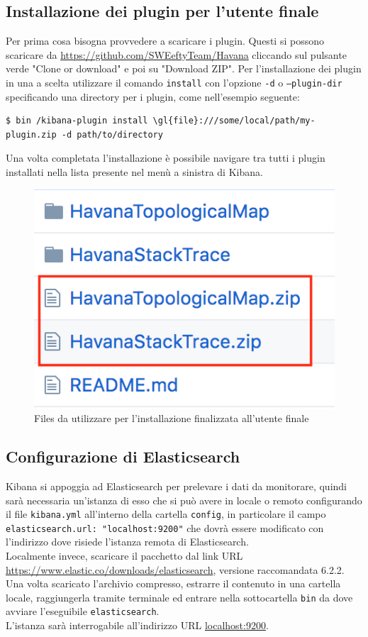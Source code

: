 \subsection{Installazione dei plugin per l'utente finale}
Per prima cosa bisogna provvedere a scaricare i plugin. Questi si possono scaricare da \href{https://github.com/SWEeftyTeam/Havana}{https://github.com/SWEeftyTeam/Havana} cliccando sul pulsante verde "Clone or download" e poi su "Download ZIP".
Per l'installazione dei plugin in una  a scelta utilizzare il comando \texttt{install} con l'opzione \texttt{-d} o \texttt{--plugin-dir}  specificando una directory per i plugin, come nell'esempio seguente:
\begin{lstlisting}
$ bin /kibana-plugin install \gl{file}:///some/local/path/my-plugin.zip -d path/to/directory 
\end{lstlisting}
Una volta completata l'installazione è possibile navigare tra tutti i plugin installati nella lista presente nel menù a sinistra di Kibana.
\begin{figure}[H]
	\centering 
	\includegraphics{Images/strutturauser}
	\caption{Files da utilizzare per l'installazione finalizzata all'utente finale}
\end{figure}
\subsection{Configurazione di Elasticsearch}
Kibana si appoggia ad Elasticsearch per prelevare i dati da monitorare, quindi sarà necessaria un'istanza di esso che si può avere in locale o remoto configurando il file \texttt{kibana.yml} all'interno della cartella \texttt{config}, in particolare il campo \texttt{elasticsearch.url: "localhost:9200"} che dovrà essere modificato con l'indirizzo dove risiede l'istanza remota di Elasticsearch.\\
Localmente invece, scaricare il pacchetto dal link URL \url{https://www.elastic.co/downloads/elasticsearch}, versione raccomandata 6.2.2.
Una volta scaricato l'archivio compresso, estrarre il contenuto in una cartella locale, raggiungerla tramite terminale ed entrare nella sottocartella \texttt{bin} da dove avviare l'eseguibile \texttt{elasticsearch}.\\
L'istanza sarà interrogabile all'indirizzo URL \url{localhost:9200}.

